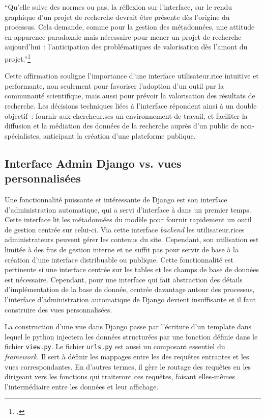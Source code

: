\begin{kwote}
``Qu'elle suive des normes ou pas, la réflexion sur l'interface, sur le
rendu graphique d'un projet de recherche devrait être présente dès
l'origine du processus. Cela demande, comme pour la gestion des
métadonnées, une attitude en apparence paradoxale mais nécessaire pour
mener un projet de recherche aujourd'hui~: l'anticipation des
problématiques de valorisation dès l'amont du projet.''\footcite{jacquot_decrire_2017}
\end{kwote}

Cette affirmation souligne l'importance d'une interface utilisateur.rice
intuitive et performante, non seulement pour favoriser
l'adoption d'un outil par la communauté scientifique, mais aussi pour
prévoir la valorisation des résultats de recherche. Les décisions
techniques liées à l'interface répondent ainsi à un double objectif~:
fournir aux chercheur.ses un environnement de travail, et faciliter la diffusion et la médiation des données de la
recherche auprès d'un public de non-spécialistes, anticipant la création
d'une plateforme publique.

\hypertarget{interface-admin-django}{%
\subsection{Interface Admin Django vs. vues personnalisées}\label{interface-admin-django}}

Une fonctionnalité puissante et intéressante de Django est son interface
d'administration automatique, qui a servi d'interface à \eida dans un
premier temps. Cette interface lit les métadonnées du modèle pour
fournir rapidement un outil de gestion centrée sur celui-ci. Via cette
interface \textit{backend} les utilisateur.rices administrateurs peuvent gérer les
contenus du site. Cependant, son utilisation est limitée à des fins de
gestion interne et ne suffit pas pour servir de base à la création d'une
interface distribuable ou publique. Cette fonctionnalité est pertinente
si une interface centrée sur les tables et les champs de base de données
est nécessaire. Cependant, pour une interface qui fait abstraction des
détails d'implémentation de la base de donnée, centrée davantage autour
des processus, l'interface d'administration automatique de Django
devient insuffisante et il faut construire des vues personnalisées.

La construction d'une vue dans Django passe par l'écriture d'un template
\html dans lequel le python injectera les données structurées par une
fonction définie dans le fichier \texttt{view.py}. Le fichier \texttt{urls.py} est aussi
un composant essentiel du \textit{framework}. Il sert à définir les mappages
entre les \URLs des requêtes entrantes et les vues correspondantes. En
d'autres termes, il gère le routage des requêtes \http en les dirigeant
vers les fonctions qui traiteront ces
requêtes, faisant elles-mêmes l'intermédiaire entre les données et leur affichage.


